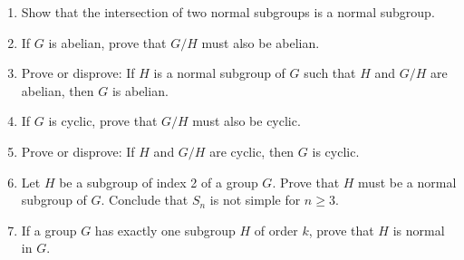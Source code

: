 {\begin{enumerate}
 
\bf\item\rm
Show that the intersection of two normal subgroups is a normal
subgroup. 
 
 
% 
% 
 
 

\bf\item\rm
If $G$ is abelian, prove that $G/H$ must also be abelian.
 
\bf\item\rm
Prove or disprove: If $H$ is a normal subgroup of $G$ such that $H$
and $G/H$ are abelian, then $G$ is abelian. 
 
 

\bf\item\rm
If $G$ is cyclic, prove that $G/H$ must also be cyclic.


\bf\item\rm
Prove or disprove: If $H$ and $G/H$ are cyclic, then $G$ is cyclic.
 
 
\bf\item\rm
Let $H$ be a subgroup of index 2 of a group $G$. Prove that $H$ must
be a normal subgroup of $G$. Conclude that $S_n$ is not simple for $n \geq 3$.

 
 

 
 
 
\bf\item\rm
If a group $G$ has exactly one subgroup $H$ of order $k$, prove that
$H$ is normal in $G$. 
 
 
% 
 

\end{enumerate}}
